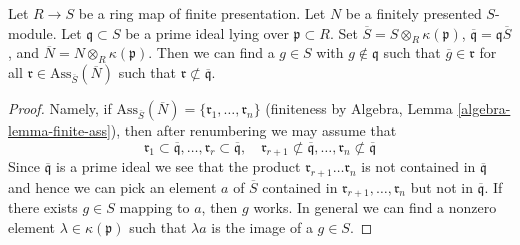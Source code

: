 \begin{lemma}
\label{lemma-weak-bourbaki-pre-pre}
Let $R \to S$ be a ring map of finite presentation. Let $N$ be a
finitely presented $S$-module. Let $\mathfrak q \subset S$ be a prime ideal
lying over $\mathfrak p \subset R$. Set
$\overline{S} = S \otimes_R \kappa(\mathfrak p)$,
$\overline{\mathfrak q} = \mathfrak q \overline{S}$, and
$\overline{N} = N \otimes_R \kappa(\mathfrak p)$. Then
we can find a $g \in S$ with
$g \not \in \mathfrak q$ such that
$\overline{g} \in \mathfrak r$ for all
$\mathfrak r \in \text{Ass}_{\overline{S}}(\overline{N})$
such that $\mathfrak r \not \subset \overline{\mathfrak q}$.
\end{lemma}

\begin{proof}
Namely, if $\text{Ass}_{\overline{S}}(\overline{N}) =
\{\mathfrak r_1, \ldots, \mathfrak r_n\}$
(finiteness by Algebra, Lemma \ref{algebra-lemma-finite-ass}),
then after renumbering we may assume that
$$
\mathfrak r_1 \subset \overline{\mathfrak q},
\ldots,
\mathfrak r_r \subset \overline{\mathfrak q}, \quad
\mathfrak r_{r + 1} \not \subset \overline{\mathfrak q},
\ldots,
\mathfrak r_n \not \subset \overline{\mathfrak q}
$$
Since $\overline{\mathfrak q}$ is a prime ideal we see that the product
$\mathfrak r_{r + 1} \ldots \mathfrak r_n$ is not contained in
$\overline{\mathfrak q}$ and hence we can pick an element
$a$ of $\overline{S}$ contained in
$\mathfrak r_{r + 1}, \ldots, \mathfrak r_n$ but not in
$\overline{\mathfrak q}$.
If there exists $g \in S$ mapping to $a$, then $g$
works. In general we can find a nonzero element
$\lambda \in \kappa(\mathfrak p)$
such that $\lambda a$ is the image of a $g \in S$.
\end{proof}
